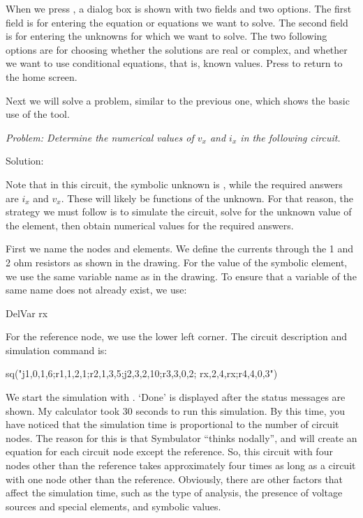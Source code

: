 When we press , a dialog box is shown with two fields and
two options. The first field is for entering the equation or
equations we want to solve. The second field is for entering the
unknowns for which we want to solve. The two following options are
for choosing whether the solutions are real or complex, and whether
we want to use conditional equations, that is, known values. Press
 to return to the home screen.

Next we will solve a problem, similar to the previous one, which
shows the basic use of the  tool.


\emph{Problem: Determine the numerical values of $v_x$ and $i_x$ in
the following circuit.}

Solution:

Note that in this circuit, the symbolic unknown is , while
the required answers are $i_x$ and $v_x$. These will likely be
functions of the unknown. For that reason, the strategy we must
follow is to simulate the circuit, solve for the unknown value of
the element, then obtain numerical values for the required answers.

First we name the nodes and elements. We define the currents through
the 1 and 2 ohm resistors as shown in the drawing. For the value of
the symbolic element, we use the same variable name as in the
drawing. To ensure that a variable of the same name does not already
exist, we use:

\begin{entry}
DelVar rx
\end{entry}

For the reference node, we use the lower left corner. The circuit
description and simulation command is:

\begin{entry}
sq\dc("j1,0,1,6;r1,1,2,1;r2,1,3,5;j2,3,2,10;r3,3,0,2;
      rx,2,4,rx;r4,4,0,3")
\end{entry}

We start the simulation with . `Done' is displayed after
the status messages are shown. My calculator took 30 seconds to run
this simulation. By this time, you have noticed that the simulation
time is proportional to the number of circuit nodes. The reason for
this is that Symbulator ``thinks nodally'', and will create an
equation for each circuit node except the reference. So, this
circuit with four nodes other than the reference takes approximately
four times as long as a circuit with one node other than the
reference. Obviously, there are other factors that affect the
simulation time, such as the type of analysis, the presence of
voltage sources and special elements, and symbolic values.

